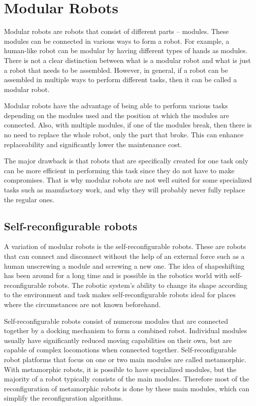 \documentclass[
  printed, %
  color,   %
  notable, %
  oneside, %
  nolof,   %
  nolot,   %
  nocover,
]{fithesis3}
\begin{document}
\chapter{Modular Robots}

Modular robots are robots that consist of different parts -- modules.
These modules can be connected in various ways to form a robot.
For example, a human-like robot can be modular by having different types of hands as modules.
There is not a clear distinction between what is a modular robot and what is just a robot that needs to be assembled. However, in general, if a robot can be assembled in multiple ways to perform different tasks, then it can be called a modular robot.

Modular robots have the advantage of being able to perform various tasks depending on the modules used and the position at which the modules are connected.
Also, with multiple modules, if one of the modules break, then there is no need to replace the whole robot, only the part that broke.
This can enhance replaceability and significantly lower the maintenance cost.

The major drawback is that robots that are specifically created for one task only can be more efficient in performing this task since they do not have to make compromises.
That is why modular robots are not well suited for some specialized tasks such as manufactory work, and why they will probably never fully replace the regular ones.

\section{Self-reconfigurable robots}

A variation of modular robots is the self-reconfigurable robots.
These are robots that can connect and disconnect without the help of an external force such as a human unscrewing a module and screwing a new one.
The idea of shapeshifting has been around for a long time and is possible in the robotics world with self-reconfigurable robots.
The robotic system's ability to change its shape according to the environment and task makes self-reconfigurable robots ideal for places where the circumstances are not known beforehand.

Self-reconfigurable robots consist of numerous modules that are connected together by a docking mechanism to form a combined robot.
Individual modules usually have significantly reduced moving capabilities on their own, but are capable of complex locomotions when connected together.
Self-reconfigurable robot platforms that focus on one or two main modules are called metamorphic.
With metamorphic robots, it is possible to have specialized modules, but the majority of a robot typically consists of the main modules.
Therefore most of the reconfiguration of metamorphic robots is done by these main modules, which can simplify the reconfiguration algorithms.
\end{document}
